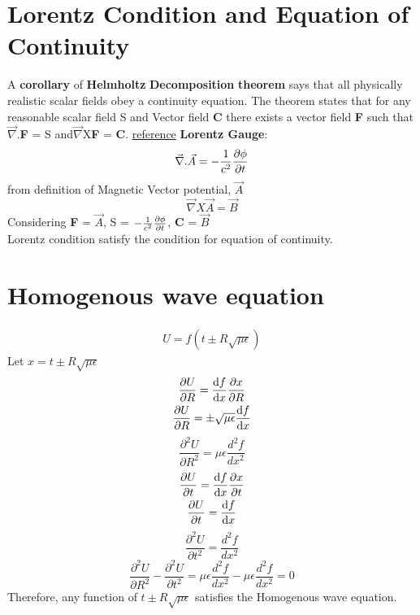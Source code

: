 \documentclass[11pt, a4paper]{article}
\begin{document}
\section{Lorentz Condition and Equation of Continuity}
A \textbf{corollary}  of \textbf{Helmholtz} \textbf{Decomposition} \textbf{theorem} says that all physically realistic scalar fields obey a continuity equation. The theorem states that for any reasonable scalar field S and Vector field \textbf{C}  there exists a vector field \textbf{F} such that \(\vec{\nabla}\).\textbf{F} = S and\(\vec{\nabla}\)X\textbf{F} = \textbf{C}. \href{http://dfcd.net/articles/potentialfields.pdf}{reference}\newline
\textbf{Lorentz Gauge}: 
\begin{gather}
    \vec{\nabla}.\vec{A} = -\frac{1}{c^2}\pdv{\phi}{t}
\end{gather}
from definition  of Magnetic Vector potential, \(\vec{A}\)
\begin{equation}
    \vec{\nabla}X\vec{A} = \vec{B}
\end{equation}
Considering \textbf{F} = $\vec{A}$, S = $-\frac{1}{c^2}\pdv{\phi}{t}$, \textbf{C} = \(\vec{B}\) \\
Lorentz condition satisfy the condition for equation of continuity. 
\section{Homogenous wave equation}
\begin{gather}
    U = f(t \pm R\sqrt{\mu \epsilon } )
\end{gather}
Let \(x = t \pm R\sqrt{\mu \epsilon }\)
\begin{gather}
    \pdv{U}{R} = \odv{f}{x} \pdv{x}{R}\\
    \pdv{U}{R} = \pm\sqrt{\mu \epsilon} \odv{f}{x}
\end{gather}
\begin{equation}
    \boxed{\frac{\partial ^2 U}{\partial R^2} = \mu \epsilon \frac{d^{2}f }{dx^2}}
\end{equation}
\begin{gather}
    \pdv{U}{t} = \odv{f}{x} \pdv{x}{t}\\
    \pdv{U}{t} = \odv{f}{x}
\end{gather}
\begin{equation}
    \boxed{\frac{\partial ^2 U}{\partial t^2} = \frac{d^{2}f }{dx^2}}
\end{equation}
\begin{equation}
    \boxed{\frac{\partial ^2 U}{\partial R^2} -\frac{\partial ^2 U}{\partial t^2} = \mu \epsilon \frac{d^{2}f }{dx^2} - \mu \epsilon \frac{d^2 f}{dx^2} = 0}
\end{equation}
Therefore, any function of $t\pm R \sqrt{\mu \epsilon}$ satisfies the Homogenous wave equation.  
\end{document}
